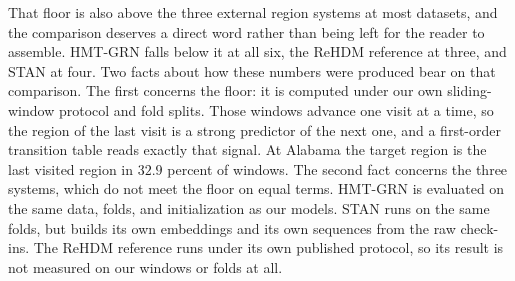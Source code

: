That floor is also above the three external region systems at most datasets, and the
comparison deserves a direct word rather than being left for the reader to assemble.
HMT-GRN falls below it at all six, the ReHDM reference at three, and STAN at four. Two
facts about how these numbers were produced bear on that comparison. The first concerns
the floor: it is computed under our own sliding-window protocol and fold splits. Those
windows advance one visit at a time, so the region of the last visit is a strong predictor
of the next one, and a first-order transition table reads exactly that signal. At Alabama the target region is the last visited region in $32.9$ percent of
windows.
The second
fact concerns the three systems, which do not meet the floor on equal terms. HMT-GRN is
evaluated on the same data, folds, and initialization as our models. STAN runs on the same
folds, but builds its own embeddings and its own sequences from the raw check-ins. The
ReHDM reference runs under its own published protocol, so its result is not measured on our
windows or folds at all.

